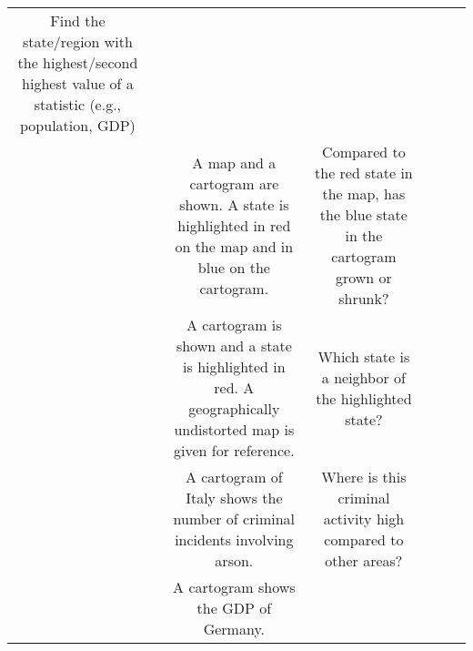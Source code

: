 \documentclass[10pt,journal,compsoc]{IEEEtran}
\begin{document}
\begin{table*}
\begin{tabular}{|c|c|c|c|c|c|c|}
\parbox{0.18\textwidth}{\small
 Find the state/region with the highest/second highest value of a statistic (e.g., population, GDP)}
&  & \\



& {\hspace{-0.15cm}} &

\parbox{0.19\textwidth}{\small
 A map and a cartogram are shown. A state is highlighted in red on the map and in  blue on the cartogram.} &

\parbox{0.18\textwidth}{\small
 Compared to the red state in the map, has the blue state in the cartogram grown or shrunk?}
&  & \\



\hline


 & {\hspace{-0.15cm}} &
\parbox{0.19\textwidth}{\small
 A cartogram is shown and a state is highlighted in red. A geographically undistorted map is given for reference.} 
 & \parbox{0.18\textwidth}{\small
 Which state is a neighbor of the highlighted state?}
&  & \\

\hline



 &  &
\parbox{0.19\textwidth}{\small
A cartogram of Italy shows the number of criminal incidents involving arson.
} &

\parbox{0.18\textwidth}{\small 
Where is this criminal activity high compared to other areas?
}
&  & \\



& & \parbox{0.19\textwidth}{\small
 A cartogram shows the GDP of Germany.}



\end{tabular}
\end{table*}
\end{document}
